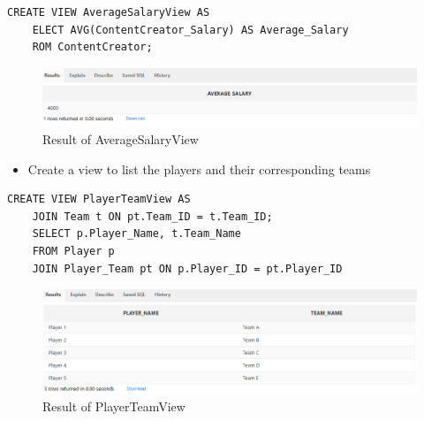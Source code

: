 \begin{lstlisting}[caption={ AvgSalaryView },label={lst:V-2}]
    CREATE VIEW AverageSalaryView AS
    ELECT AVG(ContentCreator_Salary) AS Average_Salary
    ROM ContentCreator;
\end{lstlisting}
\begin{figure}[H]
    \centering
    \includegraphics[width=1\textwidth]{images/dml/views/v2.png}
    \caption{Result of AverageSalaryView}
\end{figure}
\begin{itemize}
    \item Create a view to list the players and their corresponding teams
\end{itemize}
\begin{lstlisting}[caption={ PlayerTeamView },label={lst:V-3}]
    CREATE VIEW PlayerTeamView AS
    JOIN Team t ON pt.Team_ID = t.Team_ID;
    SELECT p.Player_Name, t.Team_Name
    FROM Player p
    JOIN Player_Team pt ON p.Player_ID = pt.Player_ID
\end{lstlisting}
\begin{figure}[H]
    \centering
    \includegraphics[width=1\textwidth]{images/dml/views/v3.png}
    \caption{Result of PlayerTeamView}
\end{figure}

\clearpage